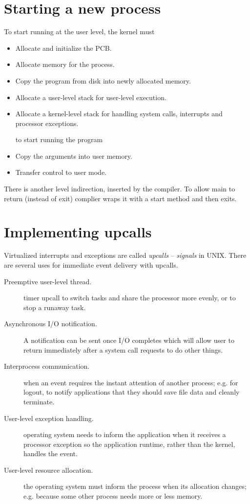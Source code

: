 \section{Starting a new process}
To start running at the user level, the kernel must
\begin{itemize}
    \item Allocate and initialize the PCB.
    \item Allocate memory for the process.
    \item Copy the program from disk into newly allocated memory.
    \item Allocate a user-level stack for user-level execution.
    \item Allocate a kernel-level stack for handling system calls, interrupts and processor exceptions.
    
    to start running the program 
    \item Copy the arguments into user memory.
    \item Transfer control to user mode.
\end{itemize}
There is another level indirection, inserted by the compiler. To allow main to return (instead of exit) complier wraps it with a start method and then exits.

\section{Implementing upcalls}
Virtualized interrupts and exceptions are called \textit{upcalls} -- \textit{signals} in UNIX. There are several uses for immediate event delivery with upcalls.

\begin{description}
    \item[Preemptive user-level thread.] timer upcall to switch tasks and share the processor more evenly, or to stop a runaway task.
    \item[Asynchronous I/O notification.] A notification can be sent once I/O completes which will allow user to return immediately after a system call requests to do other things.
    \item[Interprocess communication.] when an event requires the instant attention of another process; e.g. for logout, to notify applications that they should save file data and cleanly terminate. 
    \item[User-level exception handling.] operating system needs to inform the application when it receives a processor exception so the application runtime, rather than the kernel, handles the event. 
    \item[User-level resource allocation.] the operating system must inform the process when its allocation changes; e.g. because some other process needs more or less memory.     
\end{description}

